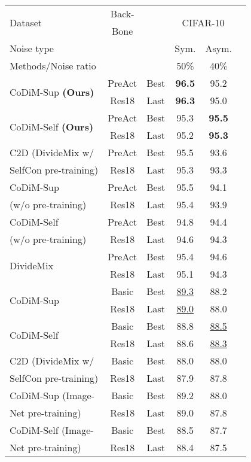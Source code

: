 \documentclass[letterpaper]{article} \usepackage{aaai22}  \usepackage{times}  \usepackage{helvet}  \usepackage{courier}  \usepackage[hyphens]{url}  \usepackage{graphicx} \usepackage{subfigure}
\begin{document}
\begin{table}[ht]
\begin{center}
\begin{tabular}{lccccc}
\hline
\multirow{2}{*}{Dataset} & Back- & & \multicolumn{2}{c}{\multirow{2}{*}{CIFAR-10}} \\
& Bone & & &\\
\hline
Noise type & & & Sym. & Asym. \\
\hline
Methods/Noise ratio & & & 50\% & 40\%  \\
\hline
\multirow{2}{*}{CoDiM-Sup \textbf{(Ours)}} & PreAct & Best & \textbf{96.5} & 95.2 \\
& Res18 & Last & \textbf{96.3} & 95.0 \\
\hline
\multirow{2}{*}{CoDiM-Self \textbf{(Ours)}} & PreAct & Best & 95.3 & \textbf{95.5} \\
& Res18 & Last & 95.2 & \textbf{95.3} \\
\hline
C2D (DivideMix w/& PreAct & Best & 95.5 & 93.6 \\
SelfCon pre-training)& Res18 & Last & 95.3 & 93.3 \\
\hline
CoDiM-Sup & PreAct & Best & 95.5 & 94.1 \\
(w/o pre-training) & Res18 & Last & 95.4 & 93.9 \\
\hline
CoDiM-Self & PreAct & Best & 94.8 & 94.4 \\
(w/o pre-training) & Res18 & Last & 94.6 & 94.3 \\
\hline
\multirow{2}{*}{DivideMix} & PreAct & Best & 95.4 & 94.6 \\
& Res18 & Last & 95.1 & 94.3 \\
\hline
\hline
\multirow{2}{*}{CoDiM-Sup} &Basic  & Best & \underline{89.3} & 88.2 \\
& Res18 & Last & \underline{89.0} & 88.0 \\
\hline
\multirow{2}{*}{CoDiM-Self} &Basic  & Best & 88.8 & \underline{88.5} \\
& Res18 & Last & 88.6 & \underline{88.3} \\
\hline
C2D (DivideMix w/ & Basic & Best & 88.0 & 88.0 \\
SelfCon pre-training)& Res18 & Last & 87.9 & 87.8 \\
\hline
CoDiM-Sup (Image- & Basic & Best & 89.2 & 88.0 \\
Net pre-training)&  Res18 & Last & 89.0 & 87.8 \\
\hline
CoDiM-Self (Image- & Basic & Best & 88.5 & 87.7 \\
Net pre-training)&  Res18 & Last & 88.4 & 87.5 \\

\end{tabular}
\end{center}
\end{table}
\end{document}
